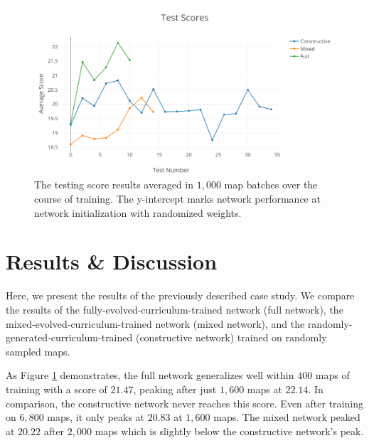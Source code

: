 \documentclass[letterpaper]{article} %
\begin{document}
\begin{figure}[!htb]
\begin{center}
\includegraphics[width=1.0\linewidth]{graphics/test-scores.png}
\caption{The testing score results averaged in $1,000$ map batches over the course of training. The y-intercept marks network performance at network initialization with randomized weights.}
\label{fig:testing-results}
\end{center}
\end{figure}

\section{Results \& Discussion}\label{sec:results/discussion}
Here, we present the results of the previously described case study. We compare the results of the fully-evolved-curriculum-trained network (full network), the mixed-evolved-curriculum-trained network (mixed network), and the randomly-generated-curriculum-trained (constructive network) trained on randomly sampled maps.


As Figure \ref{fig:testing-results} demonstrates, the full network generalizes well within $400$ maps of training with a score of $21.47$, peaking after just $1,600$ maps at $22.14$. In comparison, the constructive network never reaches this score. Even after training on $6,800$ maps, it only peaks at $20.83$ at $1,600$ maps. The mixed network peaked at $20.22$ after $2,000$ maps which is slightly below the constructive network's peak.
\end{document}

